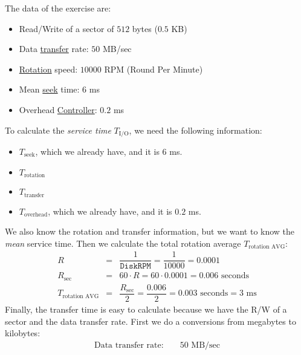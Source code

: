 \begin{exercisebox}\label{exercise: mean service time of an I/O operation}
    The data of the exercise are:
    \begin{itemize}
        \item Read/Write of a sector of $512$ bytes ($0.5$ KB)
        \item Data \underline{transfer} rate: $50$ MB/sec
        \item \underline{Rotation} speed: $10000$ RPM (Round Per Minute)
        \item Mean \underline{seek} time: $6$ ms
        \item Overhead \underline{Controller}: $0.2$ ms
    \end{itemize}
    To calculate the \emph{service time} $T_{\text{I/O}}$, we need the following information:
    \begin{itemize}
        \item $T_{\text{seek}}$, which we already have, and it is $6$ ms.
        \item $T_{\text{rotation}}$
        \item $T_{\text{transfer}}$
        \item $T_{\text{overhead}}$, which we already have, and it is $0.2$ ms.
    \end{itemize}
    We also know the rotation and transfer information, but we want to know the \emph{mean} service time. Then we calculate the total rotation average $T_{\text{rotation AVG}}$:
    \begin{equation*}
        \begin{array}{rcl}
            R &=& \dfrac{1}{\texttt{DiskRPM}} = \dfrac{1}{10000} = 0.0001 \\ [1em]
            R_{\text{sec}} &=& 60 \cdot R = 60 \cdot 0.0001 = 0.006 \text{ seconds} \\ [1em]
            T_{\text{rotation AVG}} &=& \dfrac{R_{\text{sec}}}{2} = \dfrac{0.006}{2} = 0.003 \text{ seconds} = 3 \text{ ms}
        \end{array}
    \end{equation*}
    Finally, the transfer time is easy to calculate because we have the R/W of a sector and the data transfer rate. First we do a conversions from megabytes to kilobytes:
    \begin{equation*}
        \begin{array}{rcl}
            \text{Data transfer rate: }&& 50 \text{ MB/sec} \\ [1em] 

\end{array}
\end{equation*}
\end{exercisebox}
